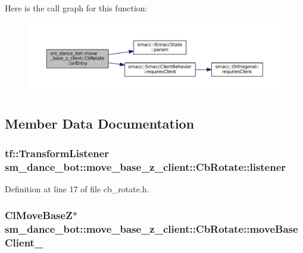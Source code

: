 Here is the call graph for this function\+:
\nopagebreak
\begin{figure}[H]
\begin{center}
\leavevmode
\includegraphics[width=350pt]{classsm__dance__bot_1_1move__base__z__client_1_1CbRotate_a61a2c0d99f36e0ce6d5b51ed4f231dca_cgraph}
\end{center}
\end{figure}




\subsection{Member Data Documentation}
\subsubsection[{\texorpdfstring{listener}{listener}}]{\setlength{\rightskip}{0pt plus 5cm}tf\+::\+Transform\+Listener sm\+\_\+dance\+\_\+bot\+::move\+\_\+base\+\_\+z\+\_\+client\+::\+Cb\+Rotate\+::listener}\hypertarget{classsm__dance__bot_1_1move__base__z__client_1_1CbRotate_a378ab8e6db83063793e07f8ebdae6d2c}{}\label{classsm__dance__bot_1_1move__base__z__client_1_1CbRotate_a378ab8e6db83063793e07f8ebdae6d2c}


Definition at line 17 of file cb\+\_\+rotate.\+h.

\subsubsection[{\texorpdfstring{move\+Base\+Client\+\_\+}{moveBaseClient_}}]{\setlength{\rightskip}{0pt plus 5cm}Cl\+Move\+BaseZ$\ast$ sm\+\_\+dance\+\_\+bot\+::move\+\_\+base\+\_\+z\+\_\+client\+::\+Cb\+Rotate\+::move\+Base\+Client\+\_\+}\hypertarget{classsm__dance__bot_1_1move__base__z__client_1_1CbRotate_ad8f923d0b85dabf481ee69b62287c028}{}\label{classsm__dance__bot_1_1move__base__z__client_1_1CbRotate_ad8f923d0b85dabf481ee69b62287c028}


